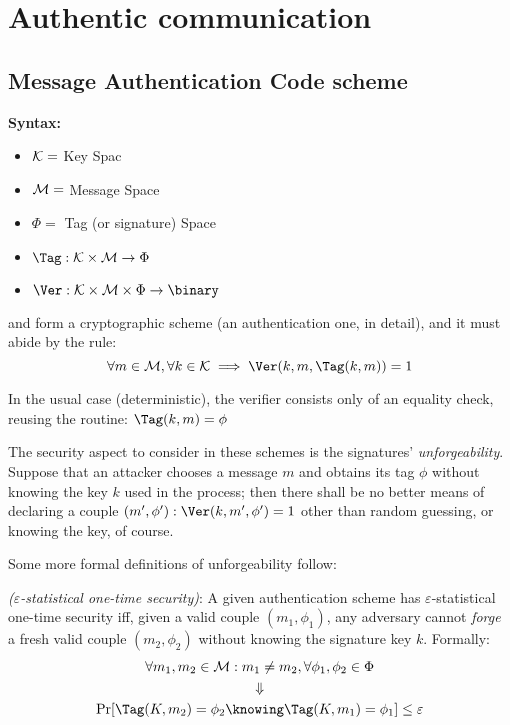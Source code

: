 
\section{Authentic communication}


\subsection{Message Authentication Code scheme}

\textbf{Syntax:}

\begin{itemize}
    \item $\mathcal{K} = $ Key Spac 
    \item $\mathcal{M} = $ Message Space
    \item $\Phi = $ Tag (or signature) Space
    \item $\Tag: \K \times \M \to \Phi$
    \item $\Ver: \K \times \M \times \Phi \to \binary$
\end{itemize}

\Tag{} and \Ver{} form a cryptographic scheme (an authentication one, in detail), and it must abide by the rule:
\[
    \forall m \in \M, \forall k \in \K \implies \Ver(k, m, \Tag(k, m)) = 1
\]

In the usual case (deterministic), the verifier consists only of an equality check, reusing the \Tag{} routine: $\Tag(k, m) = \phi$

The security aspect to consider in these schemes is the signatures' \emph{unforgeability}. Suppose that an attacker chooses a message $m$ and obtains its tag $\phi$ without knowing the key $k$ used in the process; then there shall be no better means of declaring a couple $(m', \phi') : \Ver(k, m', \phi') = 1$ other than random guessing, or knowing the key, of course.

Some more formal definitions of unforgeability follow:

\begin{definition} \emph{($\varepsilon$-statistical one-time security)}:
    A given authentication scheme has $\varepsilon$-statistical one-time security iff, given a valid couple $(m_1, \phi_1)$, any adversary cannot \emph{forge} a fresh valid couple $(m_2, \phi_2)$ without knowing the signature key $k$. Formally:
    \begin{gather*}
        \forall m_1, m_2 \in \M : m_1 \neq m_2, \forall \phi_1, \phi_2 \in \Phi \\
        \Downarrow \\
        \Pr[\Tag(K, m_2) = \phi_2 \knowing \Tag(K, m_1) = \phi_1] \leq \varepsilon
    \end{gather*}
\end{definition}

